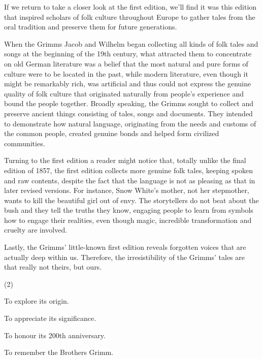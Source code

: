 \documentclass{英语试卷}
\begin{document}
\par If we return to take a closer look at the first edition, we'll find it was this edition that inspired scholars of folk culture throughout Europe to gather tales from the oral tradition and preserve them for future generations.\par
\par When the Grimms Jacob and Wilhelm began collecting all kinds of folk tales and songs at the beginning of the 19th century, what attracted them to concentrate on old German literature was a belief that the most natural and pure forms of culture were to be located in the past, while modern literature, even though it might be remarkably rich, was artificial and thus could not express the genuine quality of folk culture that originated naturally from people's experience and bound the people together. Broadly speaking, the Grimms sought to collect and preserve ancient things consisting of tales, songs and documents. They intended to demonstrate how natural language, originating from the needs and customs of the common people, created genuine bonds and helped form civilized communities.\par
\par Turning to the first edition a reader might notice that, totally unlike the final edition of 1857, the first edition collects more genuine folk tales, keeping spoken and raw contents, despite the fact that the language is not as pleasing as that in later revised versions. For instance, Snow White's mother, not her stepmother, wants to kill the beautiful girl out of envy. The storytellers do not beat about the bush and they tell the truths they know, engaging people to learn from symbols how to engage their realities, even though magic, incredible transformation and cruelty are involved.\par
\par Lastly, the Grimms' little-known first edition reveals forgotten voices that are actually deep within us. Therefore, the irresistibility of the Grimms' tales are that really not theirs, but ours.\par
{}
\begin{choices}(2)
  \item To explore its origin.
  \item To appreciate its significance.
  \item To honour its 200th anniversary.
  \item To remember the Brothers Grimm.
\end{choices}
\end{document}
